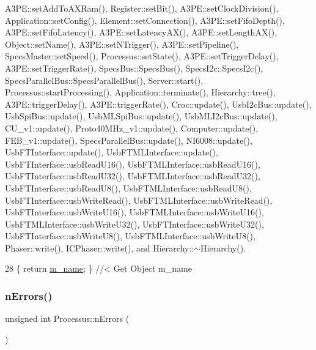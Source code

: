 A3\+P\+E\+::set\+Add\+To\+A\+X\+Ram(), Register\+::set\+Bit(), A3\+P\+E\+::set\+Clock\+Division(), Application\+::set\+Config(), Element\+::set\+Connection(), A3\+P\+E\+::set\+Fifo\+Depth(), A3\+P\+E\+::set\+Fifo\+Latency(), A3\+P\+E\+::set\+Latency\+A\+X(), A3\+P\+E\+::set\+Length\+A\+X(), Object\+::set\+Name(), A3\+P\+E\+::set\+N\+Trigger(), A3\+P\+E\+::set\+Pipeline(), Specs\+Master\+::set\+Speed(), Processus\+::set\+State(), A3\+P\+E\+::set\+Trigger\+Delay(), A3\+P\+E\+::set\+Trigger\+Rate(), Specs\+Bus\+::\+Specs\+Bus(), Specs\+I2c\+::\+Specs\+I2c(), Specs\+Parallel\+Bus\+::\+Specs\+Parallel\+Bus(), Server\+::start(), Processus\+::start\+Processing(), Application\+::terminate(), Hierarchy\+::tree(), A3\+P\+E\+::trigger\+Delay(), A3\+P\+E\+::trigger\+Rate(), Croc\+::update(), Usb\+I2c\+Bus\+::update(), Usb\+Spi\+Bus\+::update(), Usb\+M\+L\+Spi\+Bus\+::update(), Usb\+M\+L\+I2c\+Bus\+::update(), C\+U\+\_\+v1\+::update(), Proto40\+M\+Hz\+\_\+v1\+::update(), Computer\+::update(), F\+E\+B\+\_\+v1\+::update(), Specs\+Parallel\+Bus\+::update(), N\+I6008\+::update(), Usb\+F\+T\+Interface\+::update(), Usb\+F\+T\+M\+L\+Interface\+::update(), Usb\+F\+T\+Interface\+::usb\+Read\+U16(), Usb\+F\+T\+M\+L\+Interface\+::usb\+Read\+U16(), Usb\+F\+T\+Interface\+::usb\+Read\+U32(), Usb\+F\+T\+M\+L\+Interface\+::usb\+Read\+U32(), Usb\+F\+T\+Interface\+::usb\+Read\+U8(), Usb\+F\+T\+M\+L\+Interface\+::usb\+Read\+U8(), Usb\+F\+T\+Interface\+::usb\+Write\+Read(), Usb\+F\+T\+M\+L\+Interface\+::usb\+Write\+Read(), Usb\+F\+T\+Interface\+::usb\+Write\+U16(), Usb\+F\+T\+M\+L\+Interface\+::usb\+Write\+U16(), Usb\+F\+T\+M\+L\+Interface\+::usb\+Write\+U32(), Usb\+F\+T\+Interface\+::usb\+Write\+U32(), Usb\+F\+T\+Interface\+::usb\+Write\+U8(), Usb\+F\+T\+M\+L\+Interface\+::usb\+Write\+U8(), Phaser\+::write(), I\+C\+Phaser\+::write(), and Hierarchy\+::$\sim$\+Hierarchy().


\begin{DoxyCode}
28 \{ \textcolor{keywordflow}{return} \hyperlink{classObject_a8b83c95c705d2c3ba0d081fe1710f48d}{m\_name}; \} \textcolor{comment}{//< Get Object m\_name}
\end{DoxyCode}
\mbox{\label{classProcessus_a82a0487f82f07cc2c2dc2731f98149e7}} 
\subsubsection{\texorpdfstring{n\+Errors()}{nErrors()}}
{\footnotesize\ttfamily unsigned int Processus\+::n\+Errors (\begin{DoxyParamCaption}{ }\end{DoxyParamCaption})\hspace{0.3cm}{\ttfamily [inherited]}}

